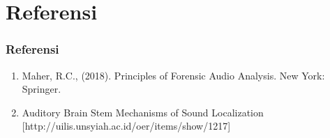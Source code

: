 \documentclass[pdflatex,compress]{beamer}
\begin{document}
\section{Referensi}

\begin{frame}
	\frametitle{Referensi}
	\begin{enumerate}
		\item Maher, R.C., (2018). Principles of Forensic Audio Analysis. New York: Springer.
		\item Auditory Brain Stem Mechanisms of Sound Localization [http://uilis.unsyiah.ac.id/oer/items/show/1217]
	\end{enumerate}
\end{frame}
\end{document}
